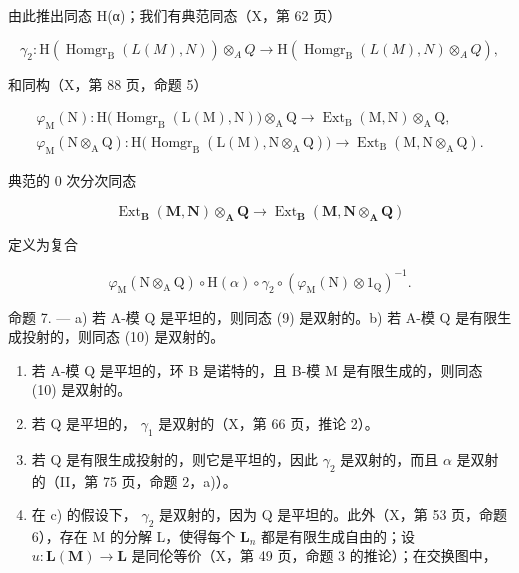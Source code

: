 由此推出同态 H(α)；我们有典范同态（X，第 62 页）

\[
\gamma_ {2}: \mathrm{H} (\operatorname{Homgr} _ {\mathrm{B}} (L (M), N)) \otimes_ {A} Q \rightarrow \mathrm{H} (\operatorname{Homgr} _ {\mathrm{B}} (L (M), N) \otimes_ {A} Q),
\]

和同构（X，第 88 页，命题 5）

\[
\begin{array}{c} \varphi_ {\mathrm{M}} (\mathrm{N}): \mathrm{H} \big (\operatorname{Homgr} _ {\mathrm{B}} (\mathrm{L} (\mathrm{M}), \mathrm{N}) \big) \otimes_ {\mathrm{A}} \mathrm{Q} \to \operatorname{Ext} _ {\mathrm{B}} (\mathrm{M}, \mathrm{N}) \otimes_ {\mathrm{A}} \mathrm{Q}, \\ \varphi_ {\mathrm{M}} (\mathrm{N} \otimes_ {\mathrm{A}} \mathrm{Q}): \mathrm{H} \big (\operatorname{Homgr} _ {\mathrm{B}} (\mathrm{L} (\mathrm{M}), \mathrm{N} \otimes_ {\mathrm{A}} \mathrm{Q}) \big) \to \operatorname{Ext} _ {\mathrm{B}} (\mathrm{M}, \mathrm{N} \otimes_ {\mathrm{A}} \mathrm{Q}). \end{array}
\]

典范的 0 次分次同态

\[
\operatorname{Ext} _ {\mathbf {B}} (\mathbf {M}, \mathbf {N}) \otimes_ {\mathbf {A}} \mathbf {Q} \rightarrow \operatorname{Ext} _ {\mathbf {B}} (\mathbf {M}, \mathbf {N} \otimes_ {\mathbf {A}} \mathbf {Q})\tag{10}
\]

定义为复合

\[
\varphi_ {\mathrm{M}} (\mathrm{N} \otimes_ {\mathrm{A}} \mathrm{Q}) \circ \mathrm{H} (\alpha) \circ \gamma_ {2} \circ \left(\varphi_ {\mathrm{M}} (\mathrm{N}) \otimes 1 _ {\mathrm{Q}}\right) ^ {- 1}.
\]

命题 7. --- a) 若 A-模 Q 是平坦的，则同态 (9) 是双射的。b) 若 A-模 Q 是有限生成投射的，则同态 (10) 是双射的。

\begin{enumerate}
\def\labelenumi{\alph{enumi})}
\setcounter{enumi}{2}
\item
  若 A-模 Q 是平坦的，环 B 是诺特的，且 B-模 M 是有限生成的，则同态 (10) 是双射的。
\item
  若 Q 是平坦的， \(\gamma_{1}\) 是双射的（X，第 66 页，推论 2）。
\item
  若 Q 是有限生成投射的，则它是平坦的，因此 \(\gamma_{2}\) 是双射的，而且 \(\alpha\) 是双射的（II，第 75 页，命题 2，a)）。
\item
  在 c) 的假设下， \(\gamma_{2}\) 是双射的，因为 Q 是平坦的。此外（X，第 53 页，命题 6），存在 M 的分解 L，使得每个 \(\mathbf{L}_{n}\) 都是有限生成自由的；设 \(u: \mathbf{L}(\mathbf{M}) \to \mathbf{L}\) 是同伦等价（X，第 49 页，命题 3 的推论）；在交换图中，
\end{enumerate}

